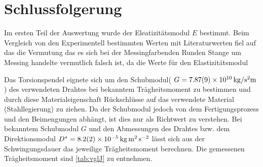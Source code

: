 
\section{Schlussfolgerung}
Im ersten Teil der Auswertung wurde der Eleatizitätsmodul $E$ bestimmt. Beim Vergleich von den Experimentell bestimmten Werten mit Literaturwerten fiel auf das die Vermutung das es sich bei der Messingfarbenden Runden Stange um Messing handelte vermutlich falsch ist, da die Werte für den Elastizitätsmodul 
























Das Torsionspendel eignete sich um den Schubmodul( $G =\SI{7.87+-0.09e10}{kg \per \second \squared  \metre}$) des verwendeten Drahtes bei bekanntem Trägheitsmoment zu bestimmen und durch diese Materialeigenschaft Rückschlüsse auf das verwendete Material (Stahllegierung) zu ziehen. Da der Schubmodul jedoch von dem Fertigungsprozess und den Beimengungen abhängt, ist dies nur als Richtwert zu verstehen. Bei bekanntem Schubmodul $G$ und den Abmessungen des Drahtes bzw. dem Direktionsmodul $D^*=\SI{8.2+-0.2e-5}{\kilogram \metre \squared \per \second \squared }$  lässt sich aus der Schwingungsdauer das jeweilige Trägheitsmoment berechnen.  Die gemessenen  Trägheitsmoment  sind \cref{tab:vglJ} zu entnehmen.








